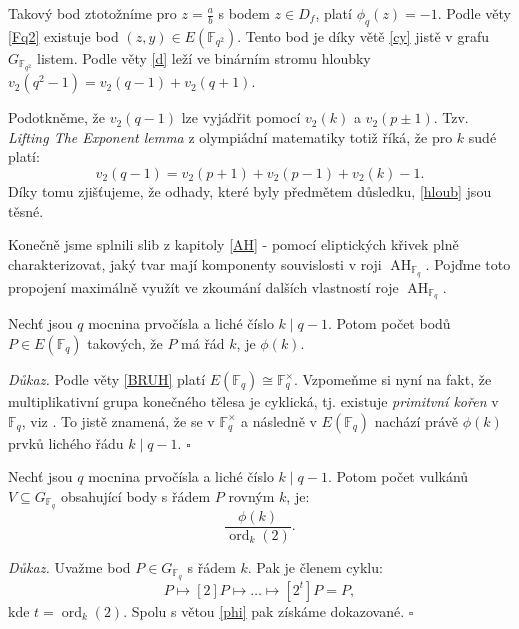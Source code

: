 \documentclass[12pt]{report}
\DeclareMathOperator{\ord}{ord}
\DeclareMathOperator{\AH}{AH}
\begin{document}


Takový bod ztotožníme pro $z = \frac{a}{b}$ s bodem $z \in D_f$, platí $\phi_q(z) = -1$. Podle věty \ref{Fq2} existuje bod $(z,y) \in E(\mathbb{F}_{q^2})$. Tento bod je díky větě \ref{cy} jistě v grafu $G_{\mathbb{F}_{q^2}}$ listem. Podle věty \ref{d} leží ve binárním stromu hloubky $v_2(q^2-1) = v_2(q-1)+v_2(q+1)$.



\begin{poznamka}
Podotkněme, že $v_2 (q-1)$ lze vyjádřit pomocí $v_2(k)$ a $v_2(p \pm 1)$. Tzv.  \textit{Lifting The Exponent lemma} z olympiádní matematiky totiž říká, že pro $k$ sudé platí: $$v_2(q-1) = v_2(p+1)+v_2(p-1)+v_2(k)-1.$$ Díky tomu zjišťujeme, že odhady, které byly předmětem důsledku, \ref{hloub} jsou těsné.
\end{poznamka}


Konečně jsme splnili slib z kapitoly \ref{AH} - pomocí eliptických křivek plně charakterizovat, jaký tvar mají komponenty souvislosti v roji $\AH_{\mathbb{F}_q}$. Pojďme toto propojení maximálně využít ve zkoumání dalších vlastností roje $\AH_{\mathbb{F}_q}$.

\begin{lemma}\label{phi}
Nechť jsou $q$ mocnina prvočísla a liché číslo $k \mid q-1$. Potom počet bodů $P \in E(\mathbb{F}_q)$ takových, že $P$ má řád $k$, je $\phi(k)$. 
\end{lemma}
\noindent \textit{Důkaz.} Podle věty \ref{BRUH} platí $E(\mathbb{F}_q) \cong \mathbb{F}_q ^{\times}$. Vzpomeňme si nyní na fakt, že multiplikativní grupa konečného tělesa je cyklická, tj. existuje \textit{primitvní kořen} v $\mathbb{F}_q$, viz \cite[Ch.4 Thm.2]{Ireland}. To jistě znamená, že se v $\mathbb{F}_q ^{\times}$ a následně v $E(\mathbb{F}_q)$ nachází právě $\phi(k)$ prvků lichého řádu $k \mid q-1$. \hfill $\square$\\


\begin{veta}\label{dudd}
Nechť jsou $q$ mocnina prvočísla a liché číslo $k \mid q-1$. Potom počet vulkánů $V \subseteq G_{\mathbb{F}_q}$ obsahující body s řádem $P$ rovným $k$, je:
$$\frac{\phi(k)}{\ord_k (2)}.$$
\end{veta}
\noindent \textit{Důkaz.} Uvažme bod $P \in G_{\mathbb{F}_q}$ s řádem $k$. Pak je členem cyklu:
$$P \mapsto [2]P \mapsto \dots \mapsto [2^t]P = P,$$
kde $t = \ord_{k} (2)$. Spolu s větou \ref{phi} pak získáme dokazované. \hfill $\square$\\
\end{document}

